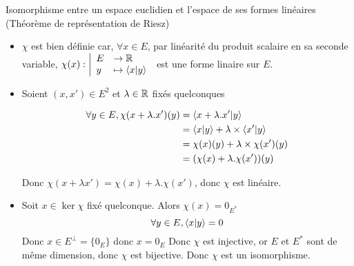 \documentclass{article}
\begin{document}
\begin{question_kholle}{Isomorphisme entre un espace euclidien et l'espace de ses formes linéaires (Théorème de représentation de Riesz)}
	\begin{itemize}[label=$\star$]
		\item $\chi$ est bien définie car, $\forall x \in E$, par linéarité du produit scalaire en sa seconde variable, $\chi(x): \left|\begin{array}{ll} E &\to \mathbb R \\ y &\mapsto \braket{ x | y }  \end{array}\right.$ est une forme linaire sur $E$.
		
		
		\item Soient $(x, x') \in E^{2}$ et $\lambda \in \mathbb R$ fixés quelconques
		
		
		\begin{align*}
			\forall y \in E,  \chi(x + \lambda .x')(y) &= \braket{ x+\lambda.x' | y }  \\
			&= \braket{ x | y } + \lambda \times\braket{ x' | y }  \\ 
			&= \chi(x)(y) + \lambda \times \chi(x')(y) \\
			&= (\chi(x) + \lambda . \chi(x') )(y)
		\end{align*}
		
		Donc $\chi(x+\lambda x') = \chi(x) + \lambda.\chi(x')$, donc $\chi$ est linéaire.
		
		\item Soit $x \in \ker \chi$ fixé quelconque.
		Alors $\chi (x) = 0_{E^{*}}$
		$$\forall y \in E, \braket{ x | y } = 0$$
		Donc $x \in E^{\perp} = \{ 0_{E} \}$ donc $x = 0_{E}$
		Donc $\chi$ est injective, or $E$ et $E^{*}$ sont de même dimension, donc $\chi$ est bijective.
		Donc $\chi$ est un isomorphisme.
	\end{itemize}
\end{question_kholle}
\end{document}
